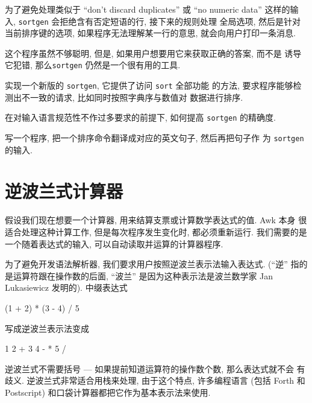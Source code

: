 为了避免处理类似于 ``don't discard duplicates'' 或 ``no numeric data'' 
这样的输入, \texttt{sortgen} 会拒绝含有否定短语的行, 接下来的规则处理
全局选项, 然后是针对当前排序键的选项, 如果程序无法理解某一行的意思,
就会向用户打印一条消息.

这个程序虽然不够聪明, 但是, 如果用户想要用它来获取正确的答案, 而不是
诱导它犯错, 那么\texttt{sortgen} 仍然是一个很有用的工具.

\begin{exercise}
    实现一个新版的 \texttt{sortgen}, 它提供了访问 \texttt{sort} 全部功能
    的方法, 要求程序能够检测出不一致的请求, 比如同时按照字典序与数值对
    数据进行排序.
\end{exercise}

\begin{exercise}
    在对输入语言规范性不作过多要求的前提下, 如何提高 \texttt{sortgen} 
    的精确度.
\end{exercise}

\begin{exercise}
    写一个程序, 把一个排序命令翻译成对应的英文句子, 然后再把句子作
    为 \texttt{sortgen} 的输入.
\end{exercise}

\section{逆波兰式计算器}
\label{sec:a_reverse_polish_calculator}

假设我们现在想要一个计算器, 用来结算支票或计算数学表达式的值. Awk 本身
很适合处理这种计算工作, 但是每次程序发生变化时, 都必须重新运行.
我们需要的是一个随着表达式的输入, 可以自动读取并运算的计算器程序.

为了避免开发语法解析器, 我们要求用户按照逆波兰表示法输入表达式. (``逆''
指的是运算符跟在操作数的后面, ``波兰'' 是因为这种表示法是波兰数学家
Jan Lukasiewicz 发明的). 中缀表达式
\begin{shell}
    (1 + 2) * (3 - 4) / 5
\end{shell}
写成逆波兰表示法变成
\begin{shell}
    1 2 + 3 4 - * 5 /
\end{shell}
逆波兰式不需要括号 --- 如果提前知道运算符的操作数个数, 那么表达式就不会
有歧义. 逆波兰式非常适合用栈来处理, 由于这个特点, 许多编程语言 (包括
Forth 和 Postscript) 和口袋计算器都把它作为基本表示法来使用.

